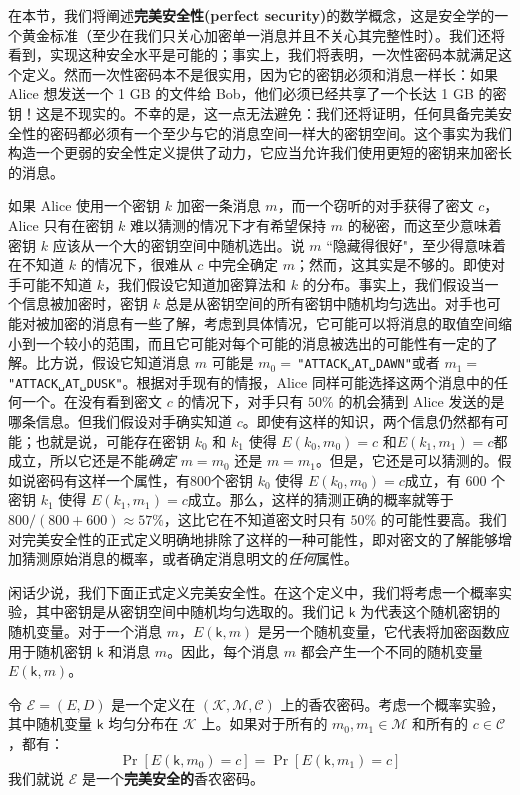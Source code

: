 在本节，我们将阐述\textbf{完美安全性(perfect security)}的数学概念，这是安全学的一个黄金标准（至少在我们只关心加密单一消息并且不关心其完整性时）。我们还将看到，实现这种安全水平是可能的；事实上，我们将表明，一次性密码本就满足这个定义。然而一次性密码本不是很实用，因为它的密钥必须和消息一样长：如果 Alice 想发送一个 1 GB 的文件给 Bob，他们必须已经共享了一个长达 1 GB 的密钥！这是不现实的。不幸的是，这一点无法避免：我们还将证明，任何具备完美安全性的密码都必须有一个至少与它的消息空间一样大的密钥空间。这个事实为我们构造一个更弱的安全性定义提供了动力，它应当允许我们使用更短的密钥来加密长的消息。

如果 Alice 使用一个密钥 $k$ 加密一条消息 $m$，而一个窃听的对手获得了密文 $c$，Alice 只有在密钥 $k$ 难以猜测的情况下才有希望保持 $m$ 的秘密，而这至少意味着密钥 $k$ 应该从一个大的密钥空间中随机选出。说 $m$ ``隐藏得很好"，至少得意味着在不知道 $k$ 的情况下，很难从 $c$ 中完全确定 $m$；然而，这其实是不够的。即使对手可能不知道 $k$，我们假设它知道加密算法和 $k$ 的分布。事实上，我们假设当一个信息被加密时，密钥 $k$ 总是从密钥空间的所有密钥中随机均匀选出。对手也可能对被加密的消息有一些了解，考虑到具体情况，它可能可以将消息的取值空间缩小到一个较小的范围，而且它可能对每个可能的消息被选出的可能性有一定的了解。比方说，假设它知道消息 $m$ 可能是 $m_0=\,$\texttt{"ATTACK␣AT␣DAWN"}或者 $m_1=\,$\texttt{"ATTACK␣AT␣DUSK"}。根据对手现有的情报，Alice 同样可能选择这两个消息中的任何一个。在没有看到密文 $c$ 的情况下，对手只有 $50\%$ 的机会猜到 Alice 发送的是哪条信息。但我们假设对手确实知道 $c$。即使有这样的知识，两个信息仍然都有可能；也就是说，可能存在密钥 $k_0$ 和 $k_1$ 使得 $E(k_0,m_0)=c$ 和$E(k_1,m_1)=c$都成立，所以它还是不能\emph{确定} $m=m_0$ 还是 $m=m_1$。但是，它还是可以猜测的。假如说密码有这样一个属性，有800个密钥 $k_0$ 使得 $E(k_0,m_0)=c$成立，有 600 个密钥 $k_1$ 使得 $E(k_1,m_1)=c$成立。那么，这样的猜测正确的概率就等于 $800/(800+600)\approx57\%$，这比它在不知道密文时只有 $50\%$ 的可能性要高。我们对完美安全性的正式定义明确地排除了这样的一种可能性，即对密文的了解能够增加猜测原始消息的概率，或者确定消息明文的\emph{任何}属性。

闲话少说，我们下面正式定义完美安全性。在这个定义中，我们将考虑一个概率实验，其中密钥是从密钥空间中随机均匀选取的。我们记 $\mathsf{k}$ 为代表这个随机密钥的随机变量。对于一个消息 $m$，$E(\mathsf{k},m)$ 是另一个随机变量，它代表将加密函数应用于随机密钥 $\mathsf{k}$ 和消息 $m$。因此，每个消息 $m$ 都会产生一个不同的随机变量 $E(\mathsf{k},m)$。

\begin{definition}[完美安全性]
令 $\mathcal{E}=(E,D)$ 是一个定义在 $(\mathcal{K},\mathcal{M},\mathcal{C})$ 上的香农密码。考虑一个概率实验，其中随机变量 $\mathsf{k}$ 均匀分布在 $\mathcal{K}$ 上。如果对于所有的 $m_0,m_1\in\mathcal{M}$ 和所有的 $c\in\mathcal{C}$，都有：
\[
\Pr[E(\mathsf{k},m_0)=c]=\Pr[E(\mathsf{k},m_1)=c]
\]
我们就说 $\mathcal{E}$ 是一个\textbf{完美安全的}香农密码。
\end{definition}

